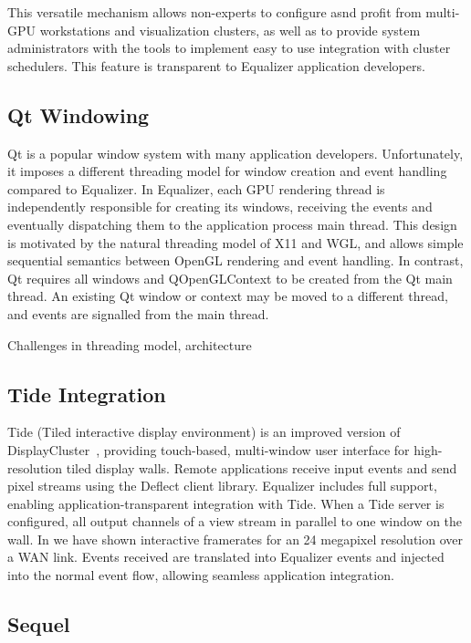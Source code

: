 \documentclass[10pt,journal,compsoc]{IEEEtran}
\begin{document}
This versatile mechanism allows non-experts to configure asnd profit from
multi-GPU workstations and visualization clusters, as well as to provide system
administrators with the tools to implement easy to use integration with cluster
schedulers. This feature is transparent to Equalizer application developers.

\subsection{Qt Windowing}

Qt is a popular window system with many application developers. Unfortunately,
it imposes a different threading model for window creation and event handling
compared to Equalizer. In Equalizer, each GPU rendering thread is independently
responsible for creating its windows, receiving the events and eventually
dispatching them to the application process main thread. This design is
motivated by the natural threading model of X11 and WGL, and allows simple
sequential semantics between OpenGL rendering and event handling. In contrast,
Qt requires all windows and QOpenGLContext to be created from the Qt main
thread. An existing Qt window or context may be moved to a different thread, and
events are signalled from the main thread.

Challenges in threading model, architecture

\subsection{Tide Integration}

Tide (Tiled interactive display environment) is an improved version of
DisplayCluster~\cite{DC}, providing touch-based, multi-window user interface for
high-resolution tiled display walls. Remote applications receive input events
and send pixel streams using the Deflect client library. Equalizer includes full
support, enabling application-transparent integration with Tide. When a Tide
server is configured, all output channels of a view stream in parallel to one
window on the wall. In \cite{deflect} we have shown interactive framerates for
an 24 megapixel resolution over a WAN link. Events received are translated into
Equalizer events and injected into the normal event flow, allowing seamless
application integration.

\subsection{Sequel}\label{sec:sequel}
\end{document}
